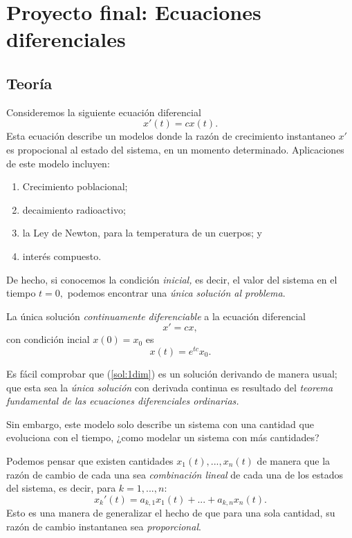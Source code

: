 \section{Proyecto final: Ecuaciones diferenciales}

\subsection*{Teoría}

Consideremos la siguiente ecuación diferencial
$$
x'(t)=cx(t).
$$
Esta ecuación describe un modelos donde la razón de crecimiento instantaneo $x'$ es propocional al estado del sistema,
en un momento determinado. Aplicaciones de este modelo incluyen:
\begin{enumerate}
 \item Crecimiento poblacional;
 \item decaimiento radioactivo;
 \item la Ley de Newton, para la temperatura de un cuerpos; y
 \item interés compuesto.
\end{enumerate}

De hecho, si conocemos la condición \emph{inicial,} es decir, el valor del sistema en el tiempo $t=0,$ podemos
encontrar una \emph{única solución al problema}.

\begin{teorema}
 La única solución \emph{continuamente diferenciable} a la ecuación diferencial
 $$
x'=cx,
 $$
 con condición incial $x(0)=x_{0}$ es
\[
 \label{sol:1dim}
 x(t)=e^{tc}x_{0}.
\]

 \end{teorema}

Es fácil comprobar que (\ref{sol:1dim}) es un solución derivando de manera usual; que esta sea la \emph{única solución}
con derivada continua es resultado del \emph{teorema fundamental de las ecuaciones diferenciales ordinarias.}

Sin embargo, este modelo solo describe un sistema con una cantidad que evoluciona con el tiempo, ¿como modelar un
sistema con más cantidades?

Podemos pensar que existen cantidades $x_{1}(t),...,x_{n}(t)$ de manera que la razón de cambio de cada una sea
\emph{combinación lineal} de cada una de los estados del sistema, es decir, para $k=1,...,n$:
$$
x_{k}'(t)=a_{k,1}x_{1}(t)+...+a_{k,n}x_{n}(t).
$$
Esto es una manera de generalizar el hecho de que para una sola cantidad, su razón de cambio instantanea sea
\emph{proporcional}.

